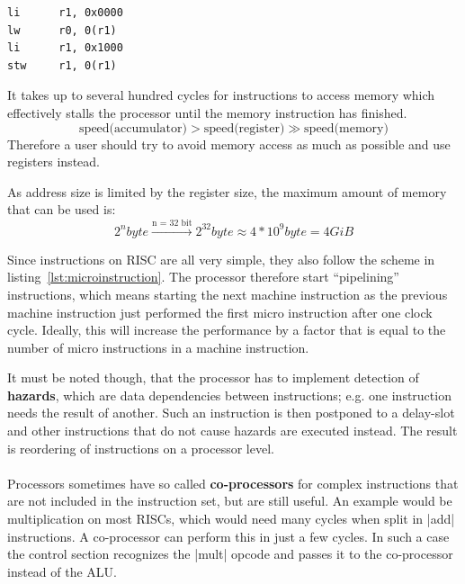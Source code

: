 \begin{lstlisting}[caption=Example Code for Load and Store Instruction. The contents of memory address {\tt 0x0000} are loaded into register {\tt r0} and then stored at address {\tt 0x1000}. See table~\ref{tab:asm} for information on used mnemonics., label=lst:loadstore]
li      r1, 0x0000
lw      r0, 0(r1)
li      r1, 0x1000
stw     r1, 0(r1)
\end{lstlisting}

It takes up to several hundred cycles for instructions to access memory which effectively stalls the processor until the memory instruction has finished.
\begin{equation*}
    \text{speed(accumulator)} > \text{speed(register)} \gg \text{speed(memory)}
\end{equation*}
Therefore a user should try to avoid memory access as much as possible and use registers instead.

As address size is limited by the register size, the maximum amount of memory that can be used is:
\begin{equation}
    2^{n} byte \xrightarrow{\text{n = 32 bit}} 2^{32} byte \approx 4*10^{9} byte = 4 GiB
\end{equation}

Since instructions on \ac{RISC} are all very simple, they also follow the scheme in listing~\ref{lst:microinstruction}.
The processor therefore start ``pipelining'' instructions, which means starting the next machine instruction as the previous machine instruction just performed the first micro instruction after one clock cycle.
Ideally, this will increase the performance by a factor that is equal to the number of micro instructions in a machine instruction.

It must be noted though, that the processor has to implement detection of \textbf{hazards}, which are data dependencies between instructions; e.g. one instruction needs the result of another.
Such an instruction is then postponed to a delay-slot and other instructions that do not cause hazards are executed instead.
The result is reordering of instructions on a processor level.
\\
\\
Processors sometimes have so called \textbf{co-processors} for complex instructions that are not included in the instruction set, but are still useful.
An example would be multiplication on most RISCs, which would need many cycles when split in |add| instructions.
A co-processor can perform this in just a few cycles.
In such a case the control section recognizes the |mult| opcode and passes it to the co-processor instead of the ALU.

